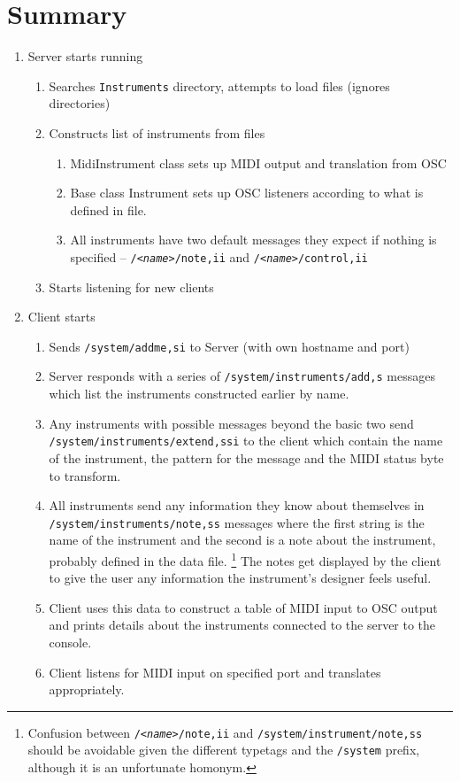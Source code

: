 \documentclass[11pt]{article}
\begin{document}
\raggedright
\section*{Summary}
\begin{enumerate}[\bf1.]
	\item Server starts running
	\begin{enumerate} [\bf a.]                          
		\item Searches \texttt{Instruments} directory, attempts to load files (ignores directories)
		\item Constructs list of instruments from files
		\begin{enumerate}
			\item MidiInstrument class sets up MIDI output and translation from OSC
			\item Base class Instrument sets up OSC listeners according to what is defined in file.
			\item All instruments have two default messages they expect if nothing is specified -- \texttt{/\textit{<name>}/note,ii} and 
				 \texttt{/\textit{<name>}/control,ii} 
		\end{enumerate}
		\item Starts listening for new clients
	 \end{enumerate}
	 \item Client starts 
	 \begin{enumerate} [\bf a.]
	 	\item Sends \texttt{/system/addme,si} to Server (with own hostname and port)
		\item Server responds with a series of \texttt{/system/instruments/add,s} messages which list the instruments constructed earlier by name.
		\item Any instruments with possible messages beyond the basic two send
			 \texttt{/system/instruments/extend,ssi} to the client
			which contain the name of the instrument, the pattern for the message and the MIDI status byte to transform.
		\item All instruments send any information they know about themselves in \texttt{/system/instruments/note,ss} messages where the first 
			string is the name of the instrument and the second is a note about the instrument, probably defined in the data file. \footnote{Confusion
			between \texttt{/\textit{<name>}/note,ii} and \texttt{/system/instrument/note,ss} should be avoidable given the different typetags and the 
			\texttt{/system} prefix, although it is an unfortunate homonym.} The notes get displayed by the client to give the user any information
			the instrument's designer feels useful.
		\item Client uses this data to construct a table of MIDI input to OSC output and prints details about the instruments connected to the server
			to the console.
		\item Client listens for MIDI input on specified port and translates appropriately.
	 \end{enumerate}
\end{enumerate}
\end{document}
